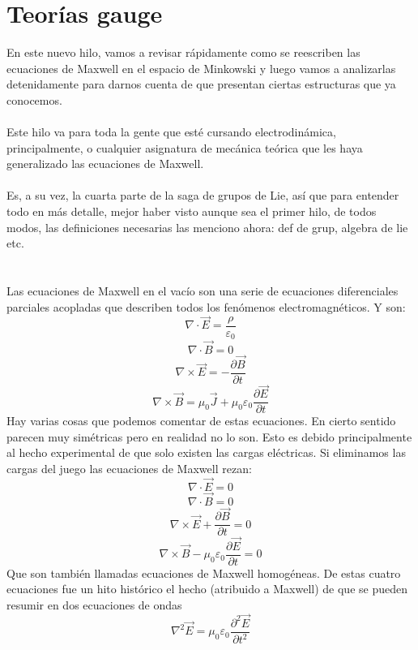\documentclass[12pt]{article}
\begin{document}
\section{Teorías gauge}
En este nuevo hilo, vamos a revisar rápidamente como se reescriben las ecuaciones de Maxwell en el espacio de Minkowski y luego vamos a analizarlas detenidamente para darnos cuenta de que presentan ciertas estructuras que ya conocemos. \\\\
Este hilo va para toda la gente que esté cursando electrodinámica, principalmente, o cualquier asignatura de mecánica teórica que les haya generalizado las ecuaciones de Maxwell.\\\\
Es, a su vez, la cuarta parte de la saga de grupos de Lie, así que para entender todo en más detalle, mejor haber visto aunque sea el primer hilo, de todos modos, las definiciones necesarias las menciono ahora: 
def de grup, algebra de lie etc.\\
\\\\
Las ecuaciones de Maxwell en el vacío son una serie de ecuaciones diferenciales parciales acopladas que describen todos los fenómenos electromagnéticos. Y son:
\begin{equation}
    \nabla \cdot \vec E =\frac{\rho}{\varepsilon_0}
\end{equation}
\begin{equation}
    \nabla \cdot \vec B =0
\end{equation}
\begin{equation}
    \nabla \times \vec E =-\frac{\partial \vec B}{\partial t}
\end{equation}
\begin{equation}
    \nabla \times \vec B =\mu_0 \vec J +\mu_0\varepsilon_0 \frac{\partial \vec E}{\partial t}
\end{equation}
Hay varias cosas que podemos comentar de estas ecuaciones. En cierto sentido parecen muy simétricas pero en realidad no lo son. Esto es debido principalmente al hecho experimental de que solo existen las cargas eléctricas. Si eliminamos las cargas del juego las ecuaciones de Maxwell rezan:
\begin{equation}
    \nabla \cdot \vec E =0
\end{equation}
\begin{equation}
    \nabla \cdot \vec B =0
\end{equation}
\begin{equation}
    \nabla \times \vec E +\frac{\partial \vec B}{\partial t}=0
\end{equation}
\begin{equation}
    \nabla \times \vec B -\mu_0\varepsilon_0 \frac{\partial \vec E}{\partial t}=0
\end{equation}
Que son también llamadas ecuaciones de Maxwell homogéneas. De estas cuatro ecuaciones fue un hito histórico el hecho (atribuido a Maxwell) de que se pueden resumir en dos ecuaciones de ondas
\newpage
\begin{equation}
    \nabla^2 \vec E =\mu_0\varepsilon_0\frac{\partial^2 \vec E}{\partial t^2}
\end{equation}
\end{document}
